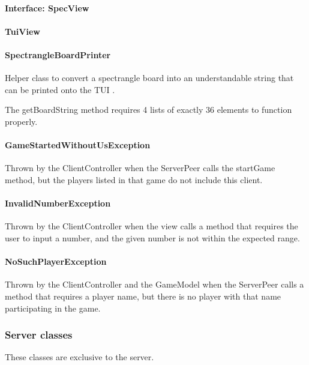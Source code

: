 \documentclass[12pt, letterpaper]{article}
\begin{document}
    \paragraph{Interface: SpecView}

    \paragraph{TuiView}

    \paragraph{SpectrangleBoardPrinter}
    Helper class to convert a spectrangle board into an understandable string that can be printed onto the TUI .

    The getBoardString method requires 4 lists of exactly 36 elements to function properly.

    \paragraph{GameStartedWithoutUsException}
    Thrown by the ClientController when the ServerPeer calls the startGame method, but the
    players listed in that game do not include this client.

    \paragraph{InvalidNumberException}
    Thrown by the ClientController when the view calls a method that requires the user to input a number, and
    the given number is not within the expected range.

    \paragraph{NoSuchPlayerException}
    Thrown by the ClientController and the GameModel when the ServerPeer calls a method that requires a player name,
    but there is no player with that name participating in the game.



    \subsubsection{Server classes}

    These classes are exclusive to the server.
\end{document}
